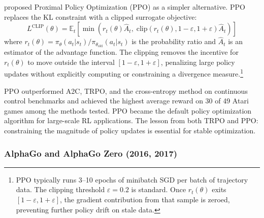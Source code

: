 \citet{Schulman2017} proposed Proximal Policy Optimization (PPO) as a simpler alternative. PPO replaces the KL constraint with a clipped surrogate objective:
\begin{equation}
L^{\text{CLIP}}(\theta) = \mathbb{E}_t \left[ \min\!\left( r_t(\theta) \hat{A}_t, \; \text{clip}(r_t(\theta), 1-\varepsilon, 1+\varepsilon) \hat{A}_t \right) \right]
\end{equation}
where $r_t(\theta) = \pi_\theta(a_t|s_t) / \pi_{\theta_{\text{old}}}(a_t|s_t)$ is the probability ratio and $\hat{A}_t$ is an estimator of the advantage function. The clipping removes the incentive for $r_t(\theta)$ to move outside the interval $[1-\varepsilon, 1+\varepsilon]$, penalizing large policy updates without explicitly computing or constraining a divergence measure.\footnote{PPO typically runs 3--10 epochs of minibatch SGD per batch of trajectory data. The clipping threshold $\varepsilon = 0.2$ is standard. Once $r_t(\theta)$ exits $[1-\varepsilon, 1+\varepsilon]$, the gradient contribution from that sample is zeroed, preventing further policy drift on stale data.}

PPO outperformed A2C, TRPO, and the cross-entropy method on continuous control benchmarks and achieved the highest average reward on 30 of 49 Atari games among the methods tested. PPO became the default policy optimization algorithm for large-scale RL applications. The lesson from both TRPO and PPO: constraining the magnitude of policy updates is essential for stable optimization.

\subsubsection{AlphaGo and AlphaGo Zero (2016, 2017)}

